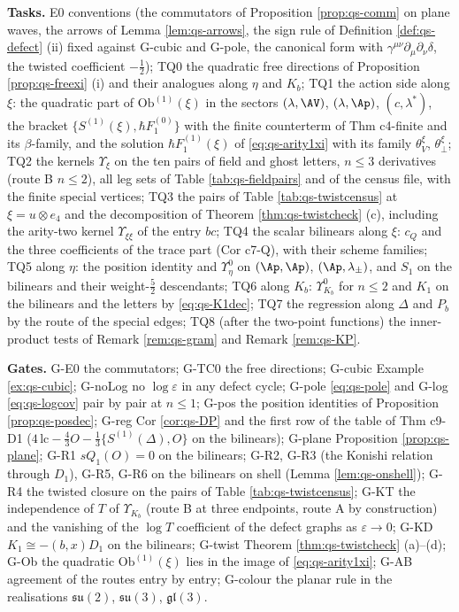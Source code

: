 \textbf{Tasks.} E0 conventions (the commutators of Proposition \ref{prop:qs-comm} on plane waves, the arrows of Lemma \ref{lem:qs-arrows}, the sign rule of Definition \ref{def:qs-defect} (ii) fixed against G-cubic and G-pole, the canonical form with $\gamma^{\mu\nu}\partial_\mu\partial_\nu\delta$, the twisted coefficient $-\tfrac12$); TQ0 the quadratic free directions of Proposition \ref{prop:qs-freexi} (i) and their analogues along $\eta$ and $K_b$; TQ1 the action side along $\xi$: the quadratic part of $\mathrm{Ob}^{(1)}(\xi)$ in the sectors $(\lambda,\AV)$, $(\lambda,\Ap)$, $(c,\lambda^*)$, the bracket $\{S^{(1)}(\xi),\hbar F_1^{(0)}\}$ with the finite counterterm of Thm c4-finite and its $\beta$-family, and the solution $\hbar F_1^{(1)}(\xi)$ of \eqref{eq:qs-arity1xi} with its family $\theta^\xi_V$, $\theta^\xi_\perp$; TQ2 the kernels $\Upsilon_\xi$ on the ten pairs of field and ghost letters, $n\le3$ derivatives (route B $n\le2$), all leg sets of Table \ref{tab:qs-fieldpairs} and of the census file, with the finite special vertices; TQ3 the pairs of Table \ref{tab:qs-twistcensus} at $\xi=u\otimes e_4$ and the decomposition of Theorem \ref{thm:qs-twistcheck} (c), including the arity-two kernel $\Upsilon_{\xi\xi}$ of the entry $bc$; TQ4 the scalar bilinears along $\xi$: $c_Q$ and the three coefficients of the trace part (Cor c7-Q), with their scheme families; TQ5 along $\eta$: the position identity and $\Upsilon^0_\eta$ on $(\Ap,\Ap)$, $(\Ap,\lambda_\pm)$, and $S_1$ on the bilinears and their weight-$\tfrac52$ descendants; TQ6 along $K_b$: $\Upsilon^0_{K_b}$ for $n\le2$ and $K_1$ on the bilinears and the letters by \eqref{eq:qs-K1dec}; TQ7 the regression along $\Delta$ and $P_b$ by the route of the special edges; TQ8 (after the two-point functions) the inner-product tests of Remark \ref{rem:qs-gram} and Remark \ref{rem:qs-KP}.

\textbf{Gates.} G-E0 the commutators; G-TC0 the free directions; G-cubic Example \ref{ex:qs-cubic}; G-noLog no $\log\varepsilon$ in any defect cycle; G-pole \eqref{eq:qs-pole} and G-log \eqref{eq:qs-logcov} pair by pair at $n\le1$; G-pos the position identities of Proposition \ref{prop:qs-posdec}; G-reg Cor \ref{cor:qs-DP} and the first row of the table of Thm c9-D1 ($4\,\mathrm{lc}-\tfrac43O-\tfrac13\{S^{(1)}(\Delta),O\}$ on the bilinears); G-plane Proposition \ref{prop:qs-plane}; G-R1 $sQ_1(O)=0$ on the bilinears; G-R2, G-R3 (the Konishi relation through $D_1$), G-R5, G-R6 on the bilinears on shell (Lemma \ref{lem:qs-onshell}); G-R4 the twisted closure on the pairs of Table \ref{tab:qs-twistcensus}; G-KT the independence of $T$ of $\Upsilon_{K_b}$ (route B at three endpoints, route A by construction) and the vanishing of the $\log T$ coefficient of the defect graphs as $\varepsilon\to0$; G-KD $K_1\cong-(b,x)D_1$ on the bilinears; G-twist Theorem \ref{thm:qs-twistcheck} (a)--(d); G-Ob the quadratic $\mathrm{Ob}^{(1)}(\xi)$ lies in the image of \eqref{eq:qs-arity1xi}; G-AB agreement of the routes entry by entry; G-colour the planar rule in the realisations $\mathfrak{su}(2)$, $\mathfrak{su}(3)$, $\mathfrak{gl}(3)$.

